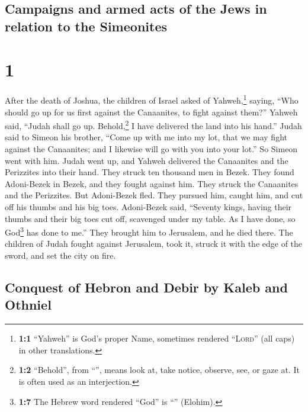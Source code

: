 \hypertarget{campaigns-and-armed-acts-of-the-jews-in-relation-to-the-simeonites}{%
\subsection{Campaigns and armed acts of the Jews in relation to the
Simeonites}\label{campaigns-and-armed-acts-of-the-jews-in-relation-to-the-simeonites}}

\hypertarget{section}{%
\section{1}\label{section}}

 After the death of Joshua, the children of Israel asked
of Yahweh,\footnote{\textbf{1:1} ``Yahweh'' is God's proper Name,
  sometimes rendered ``\textsc{Lord}'' (all caps) in other translations.}
saying, ``Who should go up for us first against the Canaanites, to fight
against them?''  Yahweh said, ``Judah shall go up.
Behold,\footnote{\textbf{1:2} ``Behold'', from ``'', means
  look at, take notice, observe, see, or gaze at. It is often used as an
  interjection.} I have delivered the land into his hand.''
 Judah said to Simeon his brother, ``Come up with me into
my lot, that we may fight against the Canaanites; and I likewise will go
with you into your lot.'' So Simeon went with him.  Judah
went up, and Yahweh delivered the Canaanites and the Perizzites into
their hand. They struck ten thousand men in Bezek.  They
found Adoni-Bezek in Bezek, and they fought against him. They struck the
Canaanites and the Perizzites.  But Adoni-Bezek fled. They
pursued him, caught him, and cut off his thumbs and his big toes.
 Adoni-Bezek said, ``Seventy kings, having their thumbs
and their big toes cut off, scavenged under my table. As I have done, so
God\footnote{\textbf{1:7} The Hebrew word rendered ``God'' is
  ``'' (Elohim).} has done to me.'' They brought him to
Jerusalem, and he died there.  The children of Judah
fought against Jerusalem, took it, struck it with the edge of the sword,
and set the city on fire.

\hypertarget{conquest-of-hebron-and-debir-by-kaleb-and-othniel}{%
\subsection{Conquest of Hebron and Debir by Kaleb and
Othniel}\label{conquest-of-hebron-and-debir-by-kaleb-and-othniel}}

